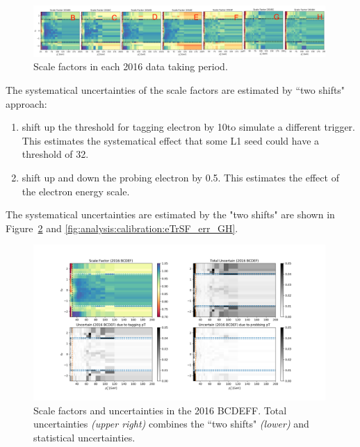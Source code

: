 \begin{figure}
    \centering
    \includegraphics[width=0.99\textwidth]{chapters/Analysis/sectionCalibration/figures/eTrigger/result_period.png}
    \caption{Scale factors in each 2016 data taking period.}
    \label{fig:analysis:calibration:ele27SFperiods}
\end{figure}
The systematical uncertainties of the scale factors are estimated by ``two shifts" approach:
\begin{enumerate}
  \item shift up the \pt threshold for tagging electron by 10\GeV to simulate a different trigger. This estimates the systematical effect that some L1 seed could have a threshold of 32\GeV.
  \item shift up and down the probing electron \pt by 0.5\GeV. This estimates the effect of the electron energy scale.
\end{enumerate}
\noindent The systematical uncertainties are estimated by the "two shifts" are shown in Figure~\ref{fig:analysis:calibration:eTrSF_err_BCDEF} and \ref{fig:analysis:calibration:eTrSF_err_GH}.

\begin{figure}
    \centering
    \includegraphics[width=0.99\textwidth]{chapters/Analysis/sectionCalibration/figures/eTrigger/result_BCDEF.png}
    \caption{Scale factors and uncertainties in the 2016 BCDEFF. Total uncertainties \emph{(upper right)} combines the ``two shifts" \emph{(lower)} and statistical uncertainties.}
    \label{fig:analysis:calibration:eTrSF_err_BCDEF}
\end{figure}

